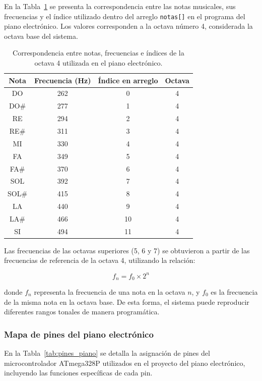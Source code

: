 En la Tabla~\ref{tab:notas_piano} se presenta la correspondencia entre las notas musicales, 
sus frecuencias y el índice utilizado dentro del arreglo \texttt{notas[]} en el programa del piano electrónico. 
Los valores corresponden a la octava número 4, considerada la octava base del sistema. 

\begin{table}[H]
\centering
\begin{tabular}{|c|c|c|c|}
\hline
\textbf{Nota} & \textbf{Frecuencia (Hz)} & \textbf{Índice en arreglo} & \textbf{Octava} \\
\hline
DO  & 262 & 0  & 4 \\
DO\# & 277 & 1  & 4 \\
RE  & 294 & 2  & 4 \\
RE\# & 311 & 3  & 4 \\
MI  & 330 & 4  & 4 \\
FA  & 349 & 5  & 4 \\
FA\# & 370 & 6  & 4 \\
SOL & 392 & 7  & 4 \\
SOL\# & 415 & 8  & 4 \\
LA  & 440 & 9  & 4 \\
LA\# & 466 & 10 & 4 \\
SI  & 494 & 11 & 4 \\
\hline
\end{tabular}
\caption{Correspondencia entre notas, frecuencias e índices de la octava 4 utilizada en el piano electrónico.}
\label{tab:notas_piano}
\end{table}

Las frecuencias de las octavas superiores (5, 6 y 7) se obtuvieron a partir de las frecuencias de referencia de la octava 4, 
utilizando la relación:

\[
f_{n} = f_{0} \times 2^{n}
\]

donde \( f_{n} \) representa la frecuencia de una nota en la octava \( n \), 
y \( f_{0} \) es la frecuencia de la misma nota en la octava base. 
De esta forma, el sistema puede reproducir diferentes rangos tonales de manera programática.

\vspace{0.5cm}

\subsubsection{Mapa de pines del piano electrónico}

En la Tabla~\ref{tab:pines_piano} se detalla la asignación de pines del microcontrolador ATmega328P utilizados en el proyecto del piano electrónico, incluyendo las funciones específicas de cada pin.

